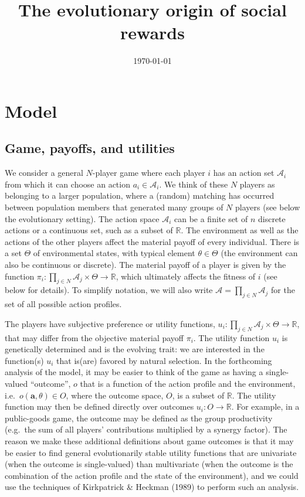 \documentclass[11pt,reqno]{amsart}
\title{The evolutionary origin of social rewards}
\date{\today}
\newcommand{\e}{\theta}
\newcommand{\Et}{\Theta}
\newcommand{\na}{n}
\newcommand{\ac}{a}
\newcommand{\Ac}{\mathcal{A}}
\newcommand{\va}{\mathbf{a}}
\newcommand{\pay}{\pi}
\newcommand{\Rn}{\mathds{R}}
\newcommand{\np}{N}%
\newcommand{\om}{o}
\newcommand{\Om}{O}
\newcommand{\pf}{u}
\begin{document}
\maketitle







\section{Model}


\subsection{Game, payoffs, and utilities}


We consider a general $\np$-player game where each player $i$ has an action set $\Ac_i$ from which it can choose an action $\ac_i \in \Ac_i$. We think of these $\np$ players as belonging to a larger population, where a (random) matching has occurred between population members that generated many groups of $\np$ players (see below the evolutionary setting). The action space $\Ac_i$ can be a finite set of $\na$ discrete actions or a continuous set, such as a subset of $\Rn$. The environment as well as the actions of the other players affect the material payoff of every individual. There is a set $\Et$ of environmental states, with typical element $\e\in\Et$ (the environment can also be continuous or discrete). The material payoff of a player is given by the function $\pay_i : \prod_{j\in \np} \Ac_j \times \Et  \to \Rn$, which ultimately affects the fitness of $i$ (see below for details). To simplify notation, we will also write $\Ac = \prod_{j\in \np} \Ac_j$ for the set of all possible action profiles.

The players have subjective preference or utility functions, $\pf_i : \prod_{j\in \np} \Ac_j \times \Et  \to \Rn$, that may differ from the objective material payoff $\pay_i$. The utility function $\pf_i$ is genetically determined and is the evolving trait: we are interested in the function(s) $\pf_i$ that is(are) favored by natural selection. In the forthcoming analysis of the model, it may be easier to think of the game as having a single-valued ``outcome'', $\om$ that is a function of the action profile and the environment, i.e.~$\om(\va,\e)\in \Om$, where the outcome space, $\Om$, is a subset of $\Rn$. The utility function may then be defined directly over outcomes $\pf_i : \Om  \to \Rn$. For example, in a public-goods game, the outcome may be defined as the group productivity (e.g.~the sum of all players' contributions multiplied by a synergy factor). The reason we make these additional definitions about game outcomes is that it may be easier to find general evolutionarily stable utility functions that are univariate (when the outcome is single-valued) than multivariate (when the outcome is the combination of the action profile and the state of the environment), and we could use the techniques of Kirkpatrick \& Heckman (1989) to perform such an analysis.
\end{document}
